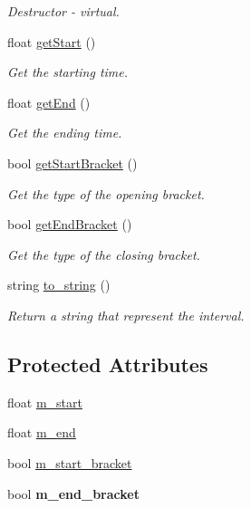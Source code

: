 \begin{DoxyCompactItemize}
\begin{DoxyCompactList}\small\item\em Destructor -\/ virtual. \end{DoxyCompactList}\item 
float \hyperlink{classInterval_a894f6f557a4dc643ef97092f0127fd5e}{get\+Start} ()
\begin{DoxyCompactList}\small\item\em Get the starting time. \end{DoxyCompactList}\item 
float \hyperlink{classInterval_af0529378470910b3d19995e5ef29e345}{get\+End} ()
\begin{DoxyCompactList}\small\item\em Get the ending time. \end{DoxyCompactList}\item 
bool \hyperlink{classInterval_a50de3cd684441c23d38e2a43931f9a2d}{get\+Start\+Bracket} ()
\begin{DoxyCompactList}\small\item\em Get the type of the opening bracket. \end{DoxyCompactList}\item 
bool \hyperlink{classInterval_a5eb116fe03e5a6b1acb9905739faf738}{get\+End\+Bracket} ()
\begin{DoxyCompactList}\small\item\em Get the type of the closing bracket. \end{DoxyCompactList}\item 
string \hyperlink{classInterval_ad248993a886f179ce22a11dfa1466555}{to\+\_\+string} ()
\begin{DoxyCompactList}\small\item\em Return a string that represent the interval. \end{DoxyCompactList}\end{DoxyCompactItemize}
\subsection*{Protected Attributes}
\begin{DoxyCompactItemize}
\item 
float \hyperlink{classInterval_a2e6c892f8f3e39465cdb4ca8b01055f2}{m\+\_\+start}
\item 
float \hyperlink{classInterval_a81756da29621f059153f0c61df1396fd}{m\+\_\+end}
\item 
bool \hyperlink{classInterval_aa10723e6479131b46e82f07dc7781812}{m\+\_\+start\+\_\+bracket}
\item 
\hypertarget{classInterval_a894bb6dde784e3e86cf6fb8267bcbbd1}{bool {\bfseries m\+\_\+end\+\_\+bracket}}\label{classInterval_a894bb6dde784e3e86cf6fb8267bcbbd1}

\end{DoxyCompactItemize}



